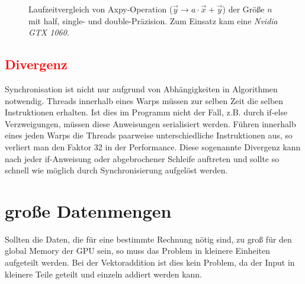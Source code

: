 		\begin{figure}[h]
  		\centering
  		\caption[Axpy mit verschiedenen Präzisionen]{Laufzeitvergleich von Axpy-Operation ($\vec{y}\rightarrow a\cdot\vec{x}+\vec{y}$) der Größe $n$ mit half, single- und double-Präzision. Zum Einsatz kam eine \textit{Nvidia GTX 1060}.}
  		\label{fig3:axpy}
		\end{figure}
		
		
		\subsection*{\textcolor{red}{Divergenz}}
		Synchronisation ist nicht nur aufgrund von Abhängigkeiten in Algorithmen notwendig. \Glspl{Thread} innerhalb eines \Glspl{Warp} müssen zur selben Zeit die selben Instruktionen erhalten. Ist dies im Programm nicht der Fall, z.B. durch if-else Verzweigungen, müssen diese Anweisungen serialisiert werden. Führen innerhalb eines jeden \Glspl{Warp} die \Glspl{Thread} paarweise unterschiedliche Instruktionen aus, so verliert man den Faktor 32 in der \Gls{Performance}. Diese sogenannte Divergenz kann nach jeder if-Anweisung oder abgebrochener Schleife auftreten und sollte so schnell wie möglich durch Synchronisierung aufgelöst werden. 
		
		\section{gro\ss e Datenmengen}\label{data}
		Sollten die Daten, die für eine bestimmte Rechnung nötig sind, zu groß für den \Gls{global Memory} der GPU sein, so muss das Problem in kleinere Einheiten aufgeteilt werden. Bei der Vektoraddition ist dies kein Problem, da der Input in kleinere Teile geteilt und einzeln addiert werden kann. 
		
